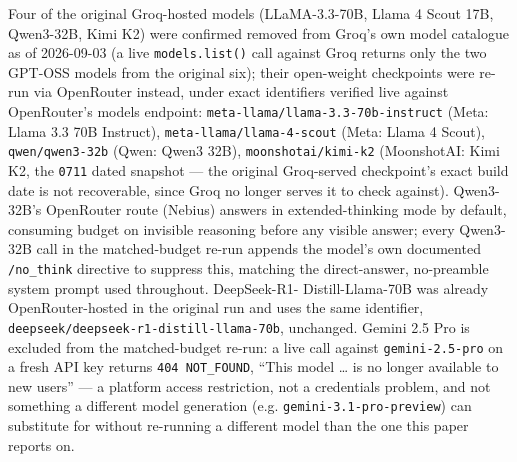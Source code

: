 Four of the original Groq-hosted models (LLaMA-3.3-70B, Llama 4 Scout 17B, Qwen3-32B, Kimi K2) were
confirmed removed from Groq's own model catalogue as of 2026-09-03 (a live \texttt{models.list()}
call against Groq returns only the two GPT-OSS models from the original six); their open-weight
checkpoints were re-run via OpenRouter instead, under exact identifiers verified live against
OpenRouter's models endpoint: \texttt{meta-llama/llama-3.3-70b-instruct} (Meta: Llama 3.3 70B
Instruct), \texttt{meta-llama/llama-4-scout} (Meta: Llama 4 Scout), \texttt{qwen/qwen3-32b} (Qwen:
Qwen3 32B), \texttt{moonshotai/kimi-k2} (MoonshotAI: Kimi K2, the \texttt{0711} dated snapshot ---
the original Groq-served checkpoint's exact build date is not recoverable, since Groq no longer
serves it to check against). Qwen3-32B's OpenRouter route (Nebius) answers in extended-thinking mode
by default, consuming budget on invisible reasoning before any visible answer; every Qwen3-32B call
in the matched-budget re-run appends the model's own documented \texttt{/no\_think} directive to
suppress this, matching the direct-answer, no-preamble system prompt used throughout. DeepSeek-R1-
Distill-Llama-70B was already OpenRouter-hosted in the original run and uses the same identifier,
\texttt{deepseek/deepseek-r1-distill-llama-70b}, unchanged. Gemini 2.5 Pro is excluded from the
matched-budget re-run: a live call against \texttt{gemini-2.5-pro} on a fresh API key returns
\texttt{404 NOT\_FOUND}, ``This model \ldots{} is no longer available to new users'' --- a platform
access restriction, not a credentials problem, and not something a different model generation (e.g.
\texttt{gemini-3.1-pro-preview}) can substitute for without re-running a different model than the
one this paper reports on.

